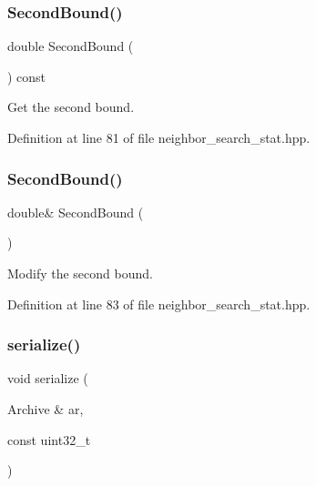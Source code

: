 \subsubsection{Second\+Bound()\hspace{0.1cm}{\footnotesize\ttfamily [1/2]}}
{\footnotesize\ttfamily double Second\+Bound (\begin{DoxyParamCaption}{ }\end{DoxyParamCaption}) const\hspace{0.3cm}{\ttfamily [inline]}}



Get the second bound. 



Definition at line 81 of file neighbor\+\_\+search\+\_\+stat.\+hpp.

\mbox{\label{classmlpack_1_1neighbor_1_1NeighborSearchStat_a09a02c2295ba43118c88ace376e60892}} 
\subsubsection{Second\+Bound()\hspace{0.1cm}{\footnotesize\ttfamily [2/2]}}
{\footnotesize\ttfamily double\& Second\+Bound (\begin{DoxyParamCaption}{ }\end{DoxyParamCaption})\hspace{0.3cm}{\ttfamily [inline]}}



Modify the second bound. 



Definition at line 83 of file neighbor\+\_\+search\+\_\+stat.\+hpp.

\mbox{\label{classmlpack_1_1neighbor_1_1NeighborSearchStat_a65cba07328997659bec80b9879b15a51}} 
\subsubsection{serialize()}
{\footnotesize\ttfamily void serialize (\begin{DoxyParamCaption}\item[{Archive \&}]{ar,  }\item[{const uint32\+\_\+t}]{ }\end{DoxyParamCaption})\hspace{0.3cm}{\ttfamily [inline]}}




